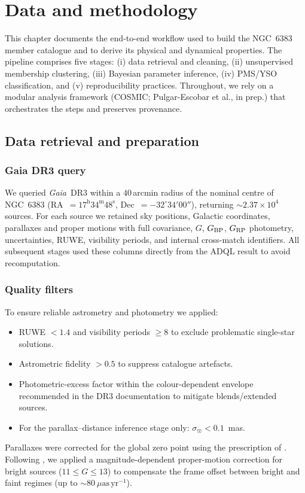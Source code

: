 \documentclass[../main.tex]{subfiles}
\begin{document}
\section{Data and methodology}
\label{chap:methods}

This chapter documents the end-to-end workflow used to build the NGC~6383 member catalogue and to derive its physical and dynamical properties. The pipeline comprises five stages: (i) data retrieval and cleaning, (ii) unsupervised membership clustering, (iii) Bayesian parameter inference, (iv) PMS/YSO classification, and (v) reproducibility practices. Throughout, we rely on a modular analysis framework (\textsc{COSMIC}; Pulgar-Escobar et al., in prep.) that orchestrates the steps and preserves provenance.

\subsection{Data retrieval and preparation}
\label{subsec:data-prep}

\subsubsection{Gaia DR3 query}
We queried \textit{Gaia}~DR3 within a $40\,$arcmin radius of the nominal centre of NGC~6383 (RA~$=17^{\mathrm{h}}34^{\mathrm{m}}48^{\mathrm{s}}$, Dec~$=-32^{\circ}34'00''$), returning $\sim2.37\times10^4$ sources. For each source we retained sky positions, Galactic coordinates, parallaxes and proper motions with full covariance, $G$, $G_{\rm BP}$, $G_{\rm RP}$ photometry, uncertainties, RUWE, visibility periods, and internal cross-match identifiers. All subsequent stages used these columns directly from the ADQL result to avoid recomputation.

\subsubsection{Quality filters}
To ensure reliable astrometry and photometry we applied:
\begin{itemize}
  \item RUWE $<1.4$ and visibility periods $\ge 8$ to exclude problematic single-star solutions.
  \item Astrometric fidelity $>0.5$ \citep{2022MNRAS.510.2597R} to suppress catalogue artefacts.
  \item Photometric-excess factor within the colour-dependent envelope recommended in the DR3 documentation to mitigate blends/extended sources.
  \item For the parallax–distance inference stage only: $\sigma_\varpi < 0.1$~mas.
\end{itemize}
Parallaxes were corrected for the global zero point using the prescription of \citet{2021A&A...649A...2L}. Following \citet{2021A&A...649A.124C}, we applied a magnitude-dependent proper-motion correction for bright sources ($11\le G \le 13$) to compensate the frame offset between bright and faint regimes (up to $\sim80~\mu\mathrm{as\,yr^{-1}}$).
\end{document}
